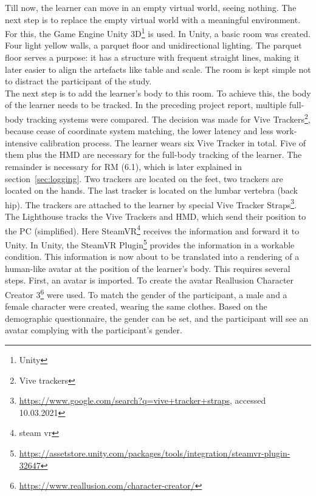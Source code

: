 Till now, the learner can move in an empty virtual world, seeing nothing. The next step is to replace the empty virtual world with a meaningful environment. For this, the Game Engine Unity 3D\footnote{Unity} is used. In Unity, a basic room was created. Four light yellow walls, a parquet floor and unidirectional lighting. The parquet floor serves a purpose: it has a structure with frequent straight lines, making it later easier to align the artefacts like table and scale. The room is kept simple not to distract the participant of the study.\\

The next step is to add the learner's body to this room. To achieve this, the body of the learner needs to be tracked. In the preceding project report, multiple full-body tracking systems were compared. The decision was made for Vive Trackers\footnote{Vive trackers}, because cease of coordinate system matching, the lower latency and less work-intensive calibration process. The learner wears six Vive Tracker in total. Five of them plus the HMD are necessary for the full-body tracking of the learner. The remainder is necessary for RM (6.1), which is later explained in section~\ref{sec:logging}. Two trackers are located on the feet, two trackers are located on the hands. The last tracker is located on the lumbar vertebra (back hip). The trackers are attached to the learner by special Vive Tracker Straps\footnote{\href{https://www.google.com/search?q=vive+tracker+straps}{https://www.google.com/search?q=vive+tracker+straps}, accessed 10.03.2021}.\\
The Lighthouse tracks the Vive Trackers and HMD, which send their position to the PC (simplified). Here SteamVR\footnote{steam vr} receives the information and forward it to Unity. In Unity, the SteamVR Plugin\footnote{\href{https://assetstore.unity.com/packages/tools/integration/steamvr-plugin-32647}{https://assetstore.unity.com/packages/tools/integration/steamvr-plugin-32647}} provides the information in a workable condition. This information is now about to be translated into a rendering of a human-like avatar at the position of the learner's body. This requires several steps. First, an avatar is imported. To create the avatar Reallusion Character Creator 3\footnote{\href{https://www.reallusion.com/character-creator/}{https://www.reallusion.com/character-creator/}} were used. To match the gender of the participant, a male and a female character were created, wearing the same clothes. Based on the demographic questionnaire, the gender can be set, and the participant will see an avatar complying with the participant's gender.

